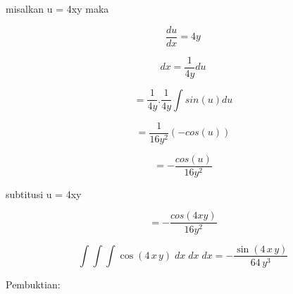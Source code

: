 \documentclass[a4paper,10pt]{article}
\begin{document}
\begin{eulernotebook}
\begin{eulercomment}
\begin{eulercomment}
\begin{eulercomment}
\begin{eulercomment}
\begin{eulercomment}
\begin{eulercomment}
\begin{eulercomment}
\begin{eulercomment}
\begin{eulercomment}
\begin{eulercomment}
\begin{eulercomment}
\begin{eulercomment}
\begin{eulercomment}
\begin{eulercomment}
\begin{eulerformula}
\[\]
\end{eulerformula}
\begin{eulercomment}
\end{eulercomment}
\begin{eulerttcomment}
 misalkan u = 4xy maka
\end{eulerttcomment}
\begin{eulerformula}
\[
\frac {du} {dx} = 4y
\]
\end{eulerformula}
\begin{eulerformula}
\[
dx = \frac {1} {4y} du
\]
\end{eulerformula}
\begin{eulercomment}
\end{eulercomment}
\begin{eulerformula}
\[
= \frac {1} {4y} . \frac {1} {4y} \int sin(u) du
\]
\end{eulerformula}
\begin{eulercomment}
\end{eulercomment}
\begin{eulerformula}
\[
= \frac {1} {16y^2} (-cos(u))
\]
\end{eulerformula}
\begin{eulercomment}
\end{eulercomment}
\begin{eulerformula}
\[
= - \frac {cos(u)} {16y^2}
\]
\end{eulerformula}
\begin{eulercomment}
\end{eulercomment}
\begin{eulerttcomment}
 subtitusi u = 4xy
\end{eulerttcomment}
\begin{eulerformula}
\[
= - \frac {cos(4xy)} {16y^2}
\]
\end{eulerformula}
\begin{eulerformula}
\[
\int {\int {\int {\cos \left(4\,x\,y\right)}{\;dx}}{\;dx}}{\;dx}=-  \frac{\sin \left(4\,x\,y\right)}{64\,y^3}
\]
\end{eulerformula}
\begin{eulerttcomment}
   Pembuktian:
\end{eulerttcomment}
\begin{eulercomment}
\end{eulercomment}
\begin{eulerformula}

\end{eulerformula}
\end{eulercomment}
\end{eulercomment}
\end{eulercomment}
\end{eulercomment}
\end{eulercomment}
\end{eulercomment}
\end{eulercomment}
\end{eulercomment}
\end{eulercomment}
\end{eulercomment}
\end{eulercomment}
\end{eulercomment}
\end{eulercomment}
\end{eulercomment}
\end{eulernotebook}
\end{document}
